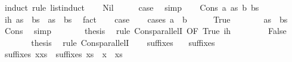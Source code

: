 \begin{isabellebody}
\ {\isacharparenleft}induct\ rule{\isacharcolon}\ list{\isacharunderscore}induct{}{\isacharparenright}\isanewline
\ \ \isamarkupfalse%
\ Nil\isanewline
\ \ \isamarkupfalse%
\ \isamarkupfalse%
\ {\isacharquery}case\ \isamarkupfalse%
\ simp\isanewline
{}\isamarkupfalse%
\isanewline
\ \ \isamarkupfalse%
\ {\isacharparenleft}Cons\ a\ as\ b\ bs{\isacharparenright}\isanewline
\ \ \isamarkupfalse%
\ ih{\isacharcolon}\ {\isachardoublequoteopen}as\ {\isasymnoteq}\ bs\ {\isasymLongrightarrow}\ as\ {\isasymparallel}\ bs{\isachardoublequoteclose}\ \isamarkupfalse%
\ fact\isanewline
\ \ \isamarkupfalse%
\ {\isacharquery}case\isanewline
\ \ \isamarkupfalse%
\ {\isacharparenleft}cases\ {\isachardoublequoteopen}a\ {\isacharequal}\ b{\isachardoublequoteclose}{\isacharparenright}\isanewline
\ \ \ \ \isamarkupfalse%
\ True\isanewline
\ \ \ \ \isamarkupfalse%
\ \isamarkupfalse%
\ {\isachardoublequoteopen}as\ {\isasymnoteq}\ bs{\isachardoublequoteclose}\ \isamarkupfalse%
\ Cons\ \isamarkupfalse%
\ simp\isanewline
\ \ \ \ \isamarkupfalse%
\ \isamarkupfalse%
\ {\isacharquery}thesis\ \isamarkupfalse%
\ {\isacharparenleft}rule\ Cons{\isacharunderscore}parallelI{}\ {\isacharbrackleft}OF\ True\ ih{\isacharbrackright}{\isacharparenright}\isanewline
\ \ \isamarkupfalse%
\isanewline
\ \ \ \ \isamarkupfalse%
\ False\isanewline
\ \ \ \ \isamarkupfalse%
\ \isamarkupfalse%
\ {\isacharquery}thesis\ \isamarkupfalse%
\ {\isacharparenleft}rule\ Cons{\isacharunderscore}parallelI{}{\isacharparenright}\isanewline
\ \ \isamarkupfalse%
\isanewline
{}\isamarkupfalse%
%
\endisatagproof
{\isafoldproof}%
%
\isadelimproof
%
\endisadelimproof
%
\isadelimdocument
%
\endisadelimdocument
%
\isatagdocument
%
\isamarkuptrue%
%
\endisatagdocument
{\isafolddocument}%
%
\isadelimdocument
%
\endisadelimdocument
{}\isamarkupfalse%
\ suffixes\ \isanewline
\ \ {\isachardoublequoteopen}suffixes\ {\isacharbrackleft}{\isacharbrackright}\ {\isacharequal}\ {\isacharbrackleft}{\isacharbrackleft}{\isacharbrackright}{\isacharbrackright}{\isachardoublequoteclose}\isanewline
{\isacharbar}\ {\isachardoublequoteopen}suffixes\ {\isacharparenleft}x{\isacharhash}xs{\isacharparenright}\ {\isacharequal}\ suffixes\ xs\ {\isacharat}\ {\isacharbrackleft}x\ {\isacharhash}\ xs{\isacharbrackright}{\isachardoublequoteclose}\isanewline

\end{isabellebody}
